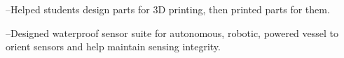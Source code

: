 \documentclass[]{deedy-resume-openfont}
\begin{document}
\begin{minipage}[t]{0.66\textwidth}

--Helped students design parts for 3D printing, then printed parts for them.
\sectionsep


--Designed waterproof sensor suite for autonomous, robotic, powered vessel to orient sensors and help maintain sensing integrity. \\
 
\sectionsep





\end{minipage}
\end{document}
